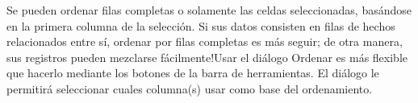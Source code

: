 \documentclass[a4paper,12pt]{article}
\begin{document}
\noindent \hspace*{0.49in}{\fontsize{10pt}{10pt}\selectfont $ \} $}\par


\noindent {\fontsize{10pt}{10pt}\selectfont $ \} $}\par


\par


\par


\noindent {}\par


\noindent \hspace*{0.49in}\par


\noindent \hspace*{0.49in}{\fontsize{10pt}{10pt}\selectfont $ \} $}\par


\noindent {\fontsize{10pt}{10pt}\selectfont $ \} $}\par

\begin{adjustwidth}{0.49in}{0.0in}
\begin{justify}
Se pueden ordenar filas completas o solamente las celdas seleccionadas, basándose en la primera columna de la selección. Si sus datos consisten en filas de hechos relacionados entre sí, ordenar por filas completas es más seguir; de otra manera, sus registros pueden mezclarse fácilmente!Usar el diálogo Ordenar es más flexible que hacerlo mediante los botones de la barra de herramientas. El diálogo le permitirá seleccionar cuales columna(s) usar como base del ordenamiento.
\end{justify}\par

\end{adjustwidth}


\par


\par
\end{document}
